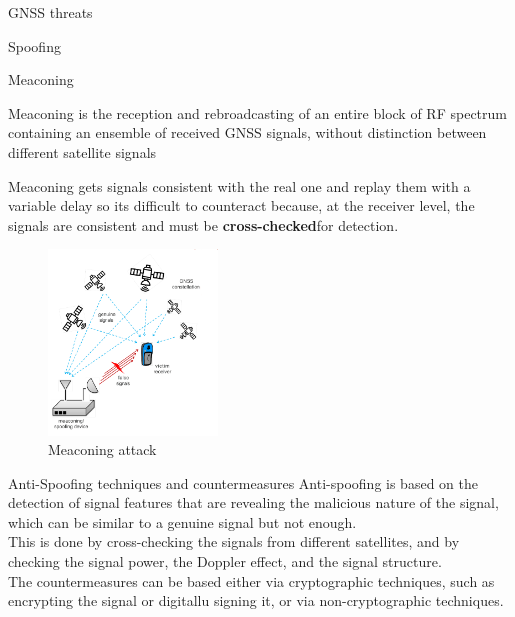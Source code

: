 \begin{section}{GNSS threats}
\begin{subsection}{Spoofing}
      \begin{subsubsection}{Meaconing}
        \begin{boxH}
          Meaconing is the reception and rebroadcasting of an entire block of RF spectrum 
          containing an ensemble of received GNSS signals, without distinction between different 
          satellite signals
        \end{boxH}
        Meaconing gets signals consistent with the real one and replay them with a variable delay
        so its difficult to counteract because, at the receiver level, the signals are consistent
        and must be \textbf{cross-checked}for detection.
        \begin{figure}[h]
          \centering
          \includegraphics[width=0.4\textwidth]{img/wireless/meaconing.png}
          \caption{Meaconing attack}
          \label{fig:GNSS meaconing}
        \end{figure}

      \end{subsubsection}

      \begin{subsubsection}{Anti-Spoofing techniques and countermeasures}
        Anti-spoofing is based on the detection of signal features that are revealing the 
        malicious nature of the signal, which can be similar to a genuine signal but not enough.\\
        This is done by cross-checking the signals from different satellites, and by checking the
        signal power, the Doppler effect, and the signal structure.\\

        The countermeasures can be based either via cryptographic techniques, such as encrypting the
        signal or digitallu signing it, or via non-cryptographic techniques.
      \end{subsubsection}

    \end{subsection}
  \end{section}


